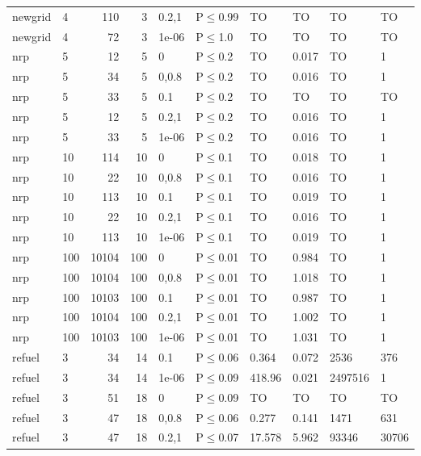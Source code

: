 \begin{longtable}{llrrllllll}
 newgrid       & 4         &    	110 &   3 & 0.2,1 & P$\leq$0.99  & TO       & TO       & TO      & TO     \\
 newgrid       & 4         &     	72 &   3 & 1e-06 & P$\leq$1.0   & TO       & TO       & TO      & TO     \\
 nrp           & 5         &     	12 &   5 & 0     & P$\leq$0.2   & TO       & 0.017    & TO      & 1      \\
 nrp           & 5         &     	34 &   5 & 0,0.8 & P$\leq$0.2   & TO       & 0.016    & TO      & 1      \\
 nrp           & 5         &     	33 &   5 & 0.1   & P$\leq$0.2   & TO       & TO       & TO      & TO     \\
 nrp           & 5         &     	12 &   5 & 0.2,1 & P$\leq$0.2   & TO       & 0.016    & TO      & 1      \\
 nrp           & 5         &     	33 &   5 & 1e-06 & P$\leq$0.2   & TO       & 0.016    & TO      & 1      \\
 nrp           & 10        &    	114 &  10 & 0     & P$\leq$0.1   & TO       & 0.018    & TO      & 1      \\
 nrp           & 10        &     	22 &  10 & 0,0.8 & P$\leq$0.1   & TO       & 0.016    & TO      & 1      \\
 nrp           & 10        &    	113 &  10 & 0.1   & P$\leq$0.1   & TO       & 0.019    & TO      & 1      \\
 nrp           & 10        &     	22 &  10 & 0.2,1 & P$\leq$0.1   & TO       & 0.016    & TO      & 1      \\
 nrp           & 10        &    	113 &  10 & 1e-06 & P$\leq$0.1   & TO       & 0.019    & TO      & 1      \\
 nrp           & 100       &  	10104 & 100 & 0     & P$\leq$0.01  & TO       & 0.984    & TO      & 1      \\
 nrp           & 100       &  	10104 & 100 & 0,0.8 & P$\leq$0.01  & TO       & 1.018    & TO      & 1      \\
 nrp           & 100       &  	10103 & 100 & 0.1   & P$\leq$0.01  & TO       & 0.987    & TO      & 1      \\
 nrp           & 100       &  	10104 & 100 & 0.2,1 & P$\leq$0.01  & TO       & 1.002    & TO      & 1      \\
 nrp           & 100       &  	10103 & 100 & 1e-06 & P$\leq$0.01  & TO       & 1.031    & TO      & 1      \\
 refuel        & 3         &     	34 &  14 & 0.1   & P$\leq$0.06  & 0.364    & 0.072    & 2536    & 376    \\
 refuel        & 3         &     	34 &  14 & 1e-06 & P$\leq$0.09  & 418.96   & 0.021    & 2497516 & 1      \\
 refuel        & 3         &     	51 &  18 & 0     & P$\leq$0.09  & TO       & TO       & TO      & TO     \\
 refuel        & 3         &     	47 &  18 & 0,0.8 & P$\leq$0.06  & 0.277    & 0.141    & 1471    & 631    \\
 refuel        & 3         &     	47 &  18 & 0.2,1 & P$\leq$0.07  & 17.578   & 5.962    & 93346   & 30706  \\
\bottomrule
\end{longtable}
